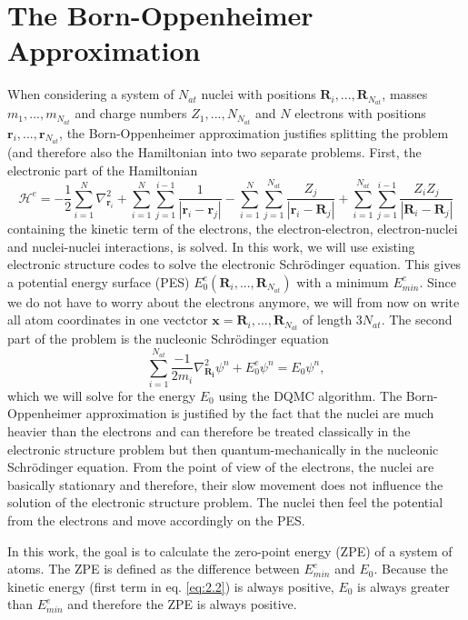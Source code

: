 \documentclass [12pt]{report}
\begin{document}
\section{The Born-Oppenheimer Approximation}
When considering a system of $N_{at}$ nuclei with positions $\bm{R}_i,...,\bm{R}_{N_{at}}$, masses $m_1,...,m_{N_{at}}$ and charge numbers $Z_1,...,N_{N_{at}}$ and $N$ electrons with positions $\bm{r}_i,...,\bm{r}_{N_{at}}$, the Born-Oppenheimer approximation justifies splitting the problem (and therefore also the Hamiltonian into two separate problems. First, the electronic part of the Hamiltonian
\begin{equation}
\mathcal{H}^e = - \frac{1}{2}\sum_{i=1}^N \nabla^2_{\bm{r}_i}  + \sum_{i=1}^{N} \sum_{j=1}^{i-1} \frac{1}{|\bm{r}_i-\bm{r}_j|} - \sum_{i=1}^{N} \sum_{j=1}^{N_{at}} \frac{Z_j}{|\bm{r}_i-\bm{R}_j|} + \sum_{i=1}^{N_{at}} \sum_{j=1}^{i-1} \frac{Z_i Z_j}{|\bm{R}_i-\bm{R}_j|}
\end{equation}
containing the kinetic term of the electrons, the electron-electron, electron-nuclei and nuclei-nuclei interactions, is solved. In this work, we will use existing electronic structure codes to solve the electronic Schrödinger equation. This gives a potential energy surface (PES) $E_0^e(\bm{R}_i,...,\bm{R}_{N_{at}})$ with a minimum $E_{min}^e$. Since we do not have to worry about the electrons anymore, we will from now on write all atom coordinates in one vectctor $\bm{x} = \bm{R}_i,...,\bm{R}_{N_{at}}$ of length $3N_{at}$.
The second part of the problem is the nucleonic Schrödinger equation
\begin{equation} \label{eq:2.2}
\sum_{i=1}^{N_{at}} \frac{-1}{2m_i} \nabla^2_{\bm{R_i}} \psi^n + E_0^e \psi^n = E_0 \psi^n,
\end{equation}
which we will solve for the energy $E_0$ using the DQMC algorithm. The Born-Oppenheimer approximation is justified by the fact that the nuclei are much heavier than the electrons and can therefore be treated classically in the electronic structure problem but then quantum-mechanically in the nucleonic Schrödinger equation. From the point of view of the electrons, the nuclei are basically stationary and therefore, their slow movement does not influence the solution of the electronic structure problem. The nuclei then feel the potential from the electrons and move accordingly on the PES.

In this work, the goal is to calculate the zero-point energy (ZPE) of a system of atoms. The ZPE is defined as the difference between $E_{min}^e$ and $E_0$. Because the kinetic energy (first term in eq. \eqref{eq:2.2}) is always positive, $E_0$ is always greater than $E_{min}^e$ and therefore the ZPE is always positive.
\end{document}
